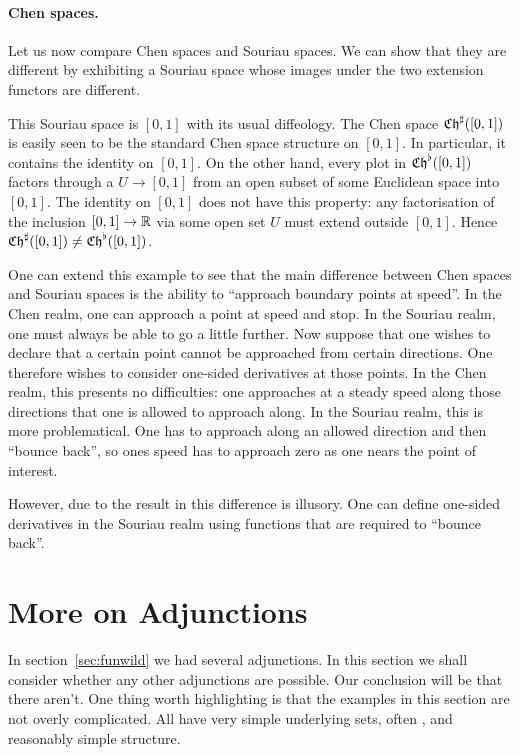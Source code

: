 \documentclass[%
a4paper,%
arxiv,%
defaults
]{myclass}
\begin{document}
\paragraph{Chen spaces.}
Let us now compare Chen spaces and Souriau spaces.
We can show that they are different by exhibiting a Souriau space whose images under the two extension functors are different.

This Souriau space is \([0,1]\) with its usual diffeology.
The Chen space \(\SoCht([0,1])\) is easily seen to be the standard Chen space structure on \([0,1]\).
In particular, it contains the identity on \([0,1]\).
On the other hand, every plot in \(\SoChb([0,1])\) factors through a \cimap \(U \to [0,1]\) from an open subset of some Euclidean space into \([0,1]\).
The identity on \([0,1]\) does not have this property: any factorisation of the inclusion \([0,1] \to \mathbb{R}\) via some open set \(U\) must extend outside \([0,1]\).
Hence \(\SoCht([0,1]) \ne \SoChb([0,1])\).

One can extend this example to see that the main difference between Chen spaces and Souriau spaces is the ability to ``approach boundary points at speed''.
In the Chen realm, one can approach a point at speed and stop.
In the Souriau realm, one must always be able to go a little further.
Now suppose that one wishes to declare that a certain point cannot be approached from certain directions.
One therefore wishes to consider one\hyp{}sided derivatives at those points.
In the Chen realm, this presents no difficulties: one approaches at a steady speed along those directions that one is allowed to approach along.
In the Souriau realm, this is more problematical.
One has to approach along an allowed direction and then ``bounce back'', so ones speed has to approach zero as one nears the point of interest.

However, due to the result in \cite[24.5]{akpm} this difference is illusory.
One can define one\hyp{}sided derivatives in the Souriau realm using functions that are required to ``bounce back''.


\section{More on Adjunctions}
\label{sec:adjoint}

In section~\ref{sec:funwild} we had several adjunctions.
In this section we shall consider whether any other adjunctions are possible.
Our conclusion will be that there aren't.
One thing worth highlighting is that the examples in this section are not overly complicated.
All have very simple underlying sets, often \R, and reasonably simple structure.
\end{document}

